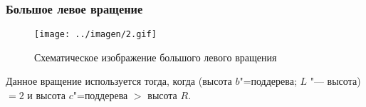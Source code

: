 \begin{frame}
    \frametitle{Большое левое вращение}

    \begin{figure}[ht]
    \texttt{[image: ../imagen/2.gif]}

    \caption{Схематическое изображение большого левого вращения}
    \end{figure}

    Данное вращение используется тогда,
    когда (высота $b$"=поддерева; $L$ "--- высота)
    $= 2$ и высота $c$"=поддерева $>$ высота $R$.
\end{frame}